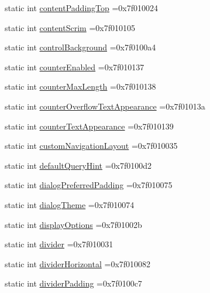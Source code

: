 \begin{DoxyCompactItemize}
\item 
static int \hyperlink{classandroid_1_1support_1_1v4_1_1R_1_1attr_a01bcbd68cfb27fa9bff4ff401c9174de}{content\+Padding\+Top} =0x7f010024
\item 
static int \hyperlink{classandroid_1_1support_1_1v4_1_1R_1_1attr_a11f2cc81c0a1252de7118bf7a3adc19e}{content\+Scrim} =0x7f010105
\item 
static int \hyperlink{classandroid_1_1support_1_1v4_1_1R_1_1attr_aed7c85a829b27222bdb9dec6505a706f}{control\+Background} =0x7f0100a4
\item 
static int \hyperlink{classandroid_1_1support_1_1v4_1_1R_1_1attr_a5f0d30d13641754ac1c2587ef5593bca}{counter\+Enabled} =0x7f010137
\item 
static int \hyperlink{classandroid_1_1support_1_1v4_1_1R_1_1attr_af7b9dc9bb16b5e873c55ef844c21a8e3}{counter\+Max\+Length} =0x7f010138
\item 
static int \hyperlink{classandroid_1_1support_1_1v4_1_1R_1_1attr_a63a591c6ef1d16eccb62ea244723d4a3}{counter\+Overflow\+Text\+Appearance} =0x7f01013a
\item 
static int \hyperlink{classandroid_1_1support_1_1v4_1_1R_1_1attr_acb70339edeae49ae1b37939e05cf1d9a}{counter\+Text\+Appearance} =0x7f010139
\item 
static int \hyperlink{classandroid_1_1support_1_1v4_1_1R_1_1attr_a79b992d45ea08400e2b705f6352e89f2}{custom\+Navigation\+Layout} =0x7f010035
\item 
static int \hyperlink{classandroid_1_1support_1_1v4_1_1R_1_1attr_a825f7cdc9650f92601bc34873e291e96}{default\+Query\+Hint} =0x7f0100d2
\item 
static int \hyperlink{classandroid_1_1support_1_1v4_1_1R_1_1attr_a2c1ecb946d64692496cf48a36058b2fb}{dialog\+Preferred\+Padding} =0x7f010075
\item 
static int \hyperlink{classandroid_1_1support_1_1v4_1_1R_1_1attr_a2a06f7a8c2e9e8a194ded551b48c858b}{dialog\+Theme} =0x7f010074
\item 
static int \hyperlink{classandroid_1_1support_1_1v4_1_1R_1_1attr_abdf70ff300a74ad07128090995bf91a5}{display\+Options} =0x7f01002b
\item 
static int \hyperlink{classandroid_1_1support_1_1v4_1_1R_1_1attr_a47e79e4bd7c9a45a24028c0210cf5744}{divider} =0x7f010031
\item 
static int \hyperlink{classandroid_1_1support_1_1v4_1_1R_1_1attr_aba7557dd9e65f47065970b2ee2447f6d}{divider\+Horizontal} =0x7f010082
\item 
static int \hyperlink{classandroid_1_1support_1_1v4_1_1R_1_1attr_a461342995bae205ef8b059feee4e4b9e}{divider\+Padding} =0x7f0100c7

\end{DoxyCompactItemize}

